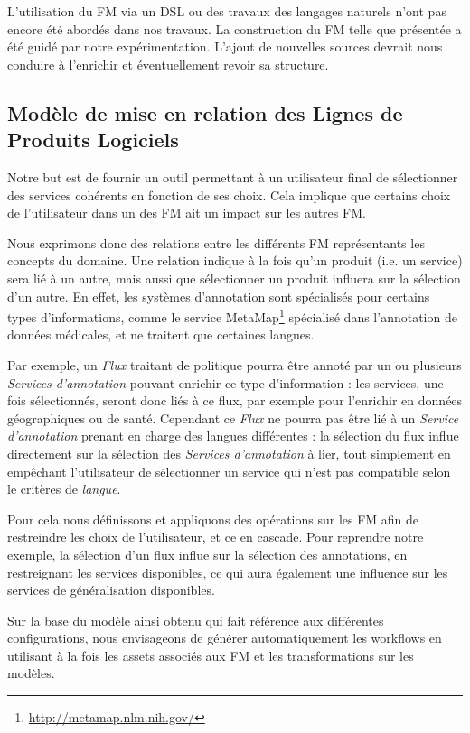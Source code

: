 \documentclass[]{easychair}
\begin{document}
L'utilisation du FM via un DSL ou des travaux des langages naturels n'ont pas encore été abordés dans nos travaux.
La construction du FM telle que présentée a été guidé par notre expérimentation. L'ajout de nouvelles sources devrait nous conduire à l'enrichir et éventuellement revoir sa structure.

\subsection{Modèle de mise en relation des Lignes de Produits Logiciels}
Notre but est de fournir un outil permettant à un utilisateur final de sélectionner des services cohérents en fonction de ses choix. Cela implique que certains choix de l'utilisateur dans un des FM ait un impact sur les autres FM.

Nous exprimons donc des relations entre les différents FM représentants les concepts du domaine. Une relation indique à la fois qu'un produit (i.e. un service) sera lié à un autre, mais aussi que sélectionner un produit influera sur la sélection d'un autre. En effet, les systèmes d'annotation sont spécialisés pour certains types d'informations, comme le service MetaMap\footnote{\url{http://metamap.nlm.nih.gov/}} spécialisé dans l'annotation de données médicales, et ne traitent que certaines langues.

Par exemple, un \textit{Flux} traitant de politique pourra être annoté par un ou plusieurs \textit{Services d'annotation} pouvant enrichir ce type d'information : les services, une fois sélectionnés, seront donc liés à ce flux, par exemple pour l'enrichir en données géographiques ou de santé. Cependant ce \textit{Flux} ne pourra pas être lié à un \textit{Service d'annotation} prenant en charge des langues différentes : la sélection du flux influe directement sur la sélection des \textit{Services d'annotation} à lier, tout simplement en empêchant l'utilisateur de sélectionner un service qui n'est pas compatible selon le critères de \textit{langue}.

Pour cela nous définissons et appliquons des opérations sur les FM \cite{Acher2011} afin de restreindre les choix de l'utilisateur, et ce en cascade. Pour reprendre notre exemple, la sélection d'un flux influe sur la sélection des annotations, en restreignant les services disponibles, ce qui aura également une influence sur les services de généralisation disponibles.

Sur la base du modèle ainsi obtenu qui fait référence aux différentes configurations, nous envisageons de générer automatiquement les workflows en utilisant à la fois les assets associés aux FM et les transformations sur les modèles.
\end{document}
